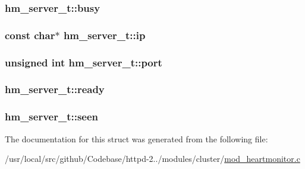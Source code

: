 \subsubsection[{\texorpdfstring{busy}{busy}}]{ hm\+\_\+server\+\_\+t\+::busy}\hypertarget{structhm__server__t_a439a8fec13643f916a245356b8d7c531}{}\label{structhm__server__t_a439a8fec13643f916a245356b8d7c531}
\subsubsection[{\texorpdfstring{ip}{ip}}]{\setlength{\rightskip}{0pt plus 5cm}const char$\ast$ hm\+\_\+server\+\_\+t\+::ip}\hypertarget{structhm__server__t_a8493413fcec7fc585224693411b4e770}{}\label{structhm__server__t_a8493413fcec7fc585224693411b4e770}
\subsubsection[{\texorpdfstring{port}{port}}]{\setlength{\rightskip}{0pt plus 5cm}unsigned {\bf int} hm\+\_\+server\+\_\+t\+::port}\hypertarget{structhm__server__t_a8842acd43edafee0af8ce5e5d450541a}{}\label{structhm__server__t_a8842acd43edafee0af8ce5e5d450541a}
\subsubsection[{\texorpdfstring{ready}{ready}}]{ hm\+\_\+server\+\_\+t\+::ready}\hypertarget{structhm__server__t_a35d0e2fb870eaa3a70ea4ae60f165791}{}\label{structhm__server__t_a35d0e2fb870eaa3a70ea4ae60f165791}
\subsubsection[{\texorpdfstring{seen}{seen}}]{ hm\+\_\+server\+\_\+t\+::seen}\hypertarget{structhm__server__t_a6e3c9c14a5b5d651c49f8257acdde620}{}\label{structhm__server__t_a6e3c9c14a5b5d651c49f8257acdde620}


The documentation for this struct was generated from the following file\+:\begin{DoxyCompactItemize}
\item 
/usr/local/src/github/\+Codebase/httpd-\/2../modules/cluster/\hyperlink{mod__heartmonitor_8c}{mod\+\_\+heartmonitor.\+c}\end{DoxyCompactItemize}
